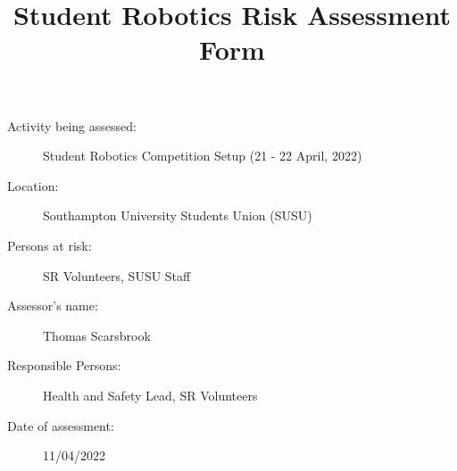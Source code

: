 \documentclass[12pt,a4paper]{scrartcl}
\title{Student Robotics Risk Assessment Form}
\begin{document}
\maketitle

\begin{description}
\item[Activity being assessed:] Student Robotics Competition Setup (21 - 22 April, 2022)
\item[Location:] Southampton University Students Union (SUSU)
\item[Persons at risk:] SR Volunteers, SUSU Staff
\end{description}

\begin{description}
\item[Assessor's name:] Thomas Scarsbrook
\item[Responsible Persons:] Health and Safety Lead, SR Volunteers
\item[Date of assessment:] 11/04/2022
\end{description}
\clearpage

\renewcommand{\cellalign}{tl}
\renewcommand{\theadalign}{tl}

\newcommand{\risk}[4]{
	#1 & #2 & #3 & #4 \\
}
\end{document}
